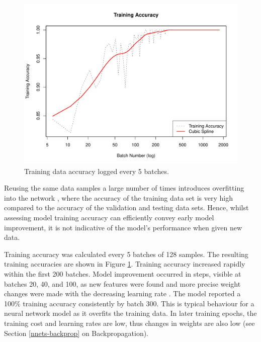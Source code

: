 \begin{figure}[b]
	\centering
	\includegraphics[width=\textwidth]{Images/7_train_acc4.pdf}
	\caption{\small{Training data accuracy logged every 5 batches.}}
	\label{results-train-acc4-fig}
\end{figure}

Reusing the same data samples a large number of times introduces overfitting into the network \citep{Goodfellow-et-al-2016}, where the accuracy of the training data set is very high compared to the accuracy of the validation and testing data sets. Hence, whilst assessing model training accuracy can efficiently convey early model improvement, it is not indicative of the model's performance when given new data.

Training accuracy was calculated every 5 batches of 128 samples. The resulting training accuracies are shown in Figure \ref{results-train-acc4-fig}. Training accuracy increased rapidly within the first 200 batches. Model improvement occurred in steps, visible at batches 20, 40, and 100, as new features were found and more precise weight changes were made with the decreasing learning rate \citep{Folly2009, Nielson2015}. The model reported a 100\% training accuracy consistently by batch 300. This is typical behaviour for a neural network model as it overfits the training data. In later training epochs, the training cost and learning rates are low, thus changes in weights are also low (see Section \ref{nnets-backprop} on Backpropagation).

